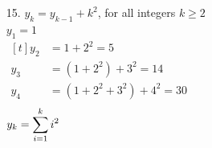 \documentclass[letterpaper,fleqn,leqno]{article}
\begin{document}
\begin{enumerate}[(a)]
{\begin{enumerate}
			\end{enumerate}
		}
		\newpage
		\begin{enumerate}
			\item [15.]
			$y_k=y_{k-1}+k^2$, for all integers $k\geq2$ \\
			$y_1=1$ \\
			$\begin{aligned}[t]
				y_2 &= 1+2^2 = 5 \\
				y_3 &= (1+2^2)+3^2 = 14 \\
				y_4 &= (1+2^2+3^2)+4^2 = 30 \\
			\end{aligned}$ \\
			$y_k=\displaystyle\sum\limits_{i=1}^{k}i^2$ \\
			

\end{enumerate}
\end{enumerate}
\end{document}
